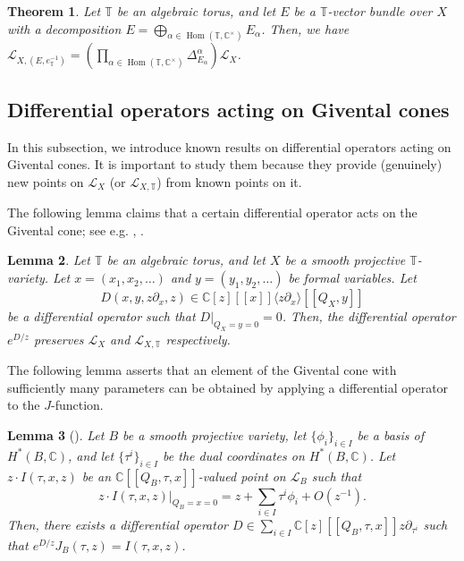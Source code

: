 \documentclass[a4paper,12pt]{amsart}
\numberwithin{equation}{section}
\newtheorem{theorem}{Theorem}[section]
\newtheorem{lemma}[theorem]{Lemma}
\theoremstyle{definition}
\newcommand{\C}{\mathbb{C}}
\newcommand{\T}{\mathbb{T}}
\newcommand{\cL}{\mathcal{L}}
\newcommand{\Hom}{\operatorname{Hom}}
\begin{document}
\begin{theorem}\label{thm:QRR}
    Let $\T$ be an algebraic torus, and let $E$ be a $\T$-vector bundle over $X$ with a decomposition $E=\bigoplus_{\alpha\in\Hom(\T,\C^\times)}E_\alpha$.
    Then, we have $\cL_{X,(E,e_\T^{-1})}=(\prod_{\alpha\in\Hom(\T,\C^\times)}\Delta_{E_\alpha}^\alpha)\cL_X$.
\end{theorem}

\subsection{Differential operators acting on Givental cones}
In this subsection, we introduce known results on differential operators acting on Givental cones.
It is important to study them because they provide (genuinely) new points on $\cL_X$ (or $\cL_{X,\T}$) from known points on it.

The following lemma claims that a certain differential operator acts on the Givental cone; see e.g. \cite[\S8]{CG:quantum}, \cite[Lemma 2.7]{IK:quantum}.

\begin{lemma}\label{lem:differential_operator_preserves_cone}
    Let $\T$ be an algebraic torus, and let $X$ be a smooth projective $\T$-variety.
    Let $x=(x_1,x_2,\dots)$ and $y=(y_1,y_2,\dots)$ be formal variables.
    Let 
    \[
    D(x,y,z\partial_x,z)\in \C[z][\![x]\!]\langle z\partial_x \rangle [\![Q_X,y]\!]
    \]
    be a differential operator such that $D|_{Q_X=y=0}=0$.
    Then, the differential operator $e^{D/z}$ preserves $\cL_X$ and $\cL_{X,\T}$ respectively.
\end{lemma}

The following lemma asserts that an element of the Givental cone with sufficiently many parameters can be obtained by applying a differential operator to the $J$-function.

\begin{lemma}[{\cite[Lemma 2.8]{IK:quantum}}]\label{lem:moving_points}
    Let $B$ be a smooth projective variety, let $\{\phi_i\}_{i\in I}$ be a basis of $H^*(B,\C)$, and let $\{\tau^i\}_{i\in I}$ be the dual coordinates on $H^*(B,\C)$.
    Let $z\cdot I(\tau,x,z)$ be an $\C[\![Q_B,\tau,x]\!]$-valued point on $\cL_B$ such that
    \[
    z \cdot I(\tau,x,z)|_{Q_B=x=0} = z + \sum_{i\in I}\tau^i\phi_i + O(z^{-1}).
    \]
    Then, there exists a differential operator $D\in\sum_{i\in I}\C[z][\![Q_B,\tau,x]\!]z\partial_{\tau^i}$ such that $e^{D/z}J_B(\tau,z)=I(\tau,x,z)$.
\end{lemma}
\end{document}
